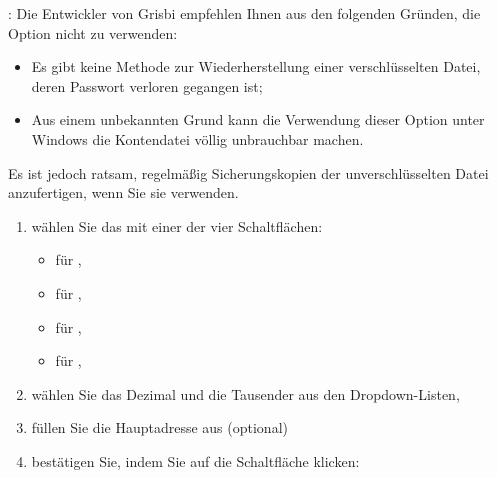 \begin{enumerate}
\Attention{}: Die Entwickler von Grisbi empfehlen Ihnen aus den folgenden Gründen, die Option  nicht zu verwenden:%
\begin{itemize}
	\item Es gibt keine Methode zur Wiederherstellung einer verschlüsselten Datei, deren Passwort verloren gegangen ist;%
	\item Aus einem unbekannten Grund kann die Verwendung dieser Option unter \gls{Windows} die Kontendatei völlig unbrauchbar machen.%
\end{itemize}  
Es ist jedoch ratsam, regelmäßig Sicherungskopien der unverschlüsselten Datei anzufertigen, wenn Sie sie verwenden.%

		\begin{enumerate}[resume]		%
			\item wählen Sie das  mit einer der vier Schaltflächen:%
				\begin{itemize}	
				\item[\textopenbullet]  für ,
				\item[\textopenbullet]  für ,
				\item[\textopenbullet]  für ,
				\item[\textopenbullet]  für ,
				\end{itemize}
			\item wählen Sie das Dezimal  und die Tausender aus den Dropdown-Listen,%
			\item füllen Sie die Hauptadresse aus (optional)%
			\item bestätigen Sie, indem Sie auf die Schaltfläche  klicken:%
		\end{enumerate}


\end{enumerate}
